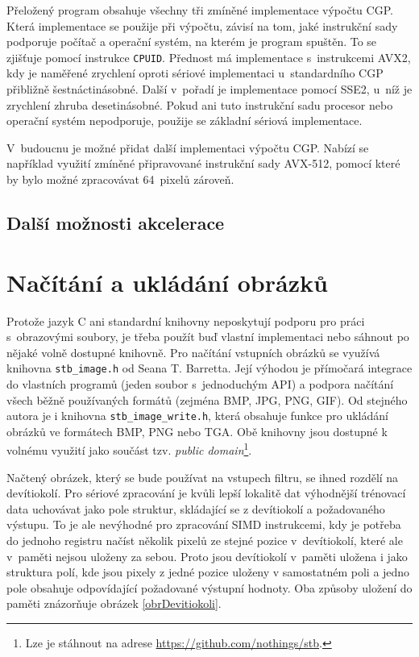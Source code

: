 Přeložený program obsahuje všechny tři zmíněné implementace výpočtu CGP. Která implementace se použije při výpočtu, závisí na tom, jaké instrukční sady podporuje počítač a operační systém, na kterém je program spuštěn. To se zjišťuje pomocí instrukce \texttt{CPUID}. Přednost má implementace s~instrukcemi AVX2, kdy je naměřené zrychlení oproti sériové implementaci u~standardního CGP přibližně šestnáctinásobné. Další v~pořadí je implementace pomocí SSE2, u~níž je zrychlení zhruba desetinásobné. Pokud ani tuto instrukční sadu procesor nebo operační systém nepodporuje, použije se základní sériová implementace.

V~budoucnu je možné přidat další implementaci výpočtu CGP. Nabízí se například využití zmíněné připravované instrukční sady AVX-512, pomocí které by bylo možné zpracovávat 64~pixelů zároveň.

\subsection{Další možnosti akcelerace}


\section{Načítání a ukládání obrázků}
\label{secImplImages}

Protože jazyk C ani standardní knihovny neposkytují podporu pro práci s~obrazovými soubory, je třeba použít buď vlastní implementaci nebo sáhnout po nějaké volně dostupné knihovně. Pro načítání vstupních obrázků se využívá knihovna \texttt{stb\_image.h} od Seana T. Barretta. Její výhodou je přímočará integrace do vlastních programů (jeden soubor s~jednoduchým API) a podpora načítání všech běžně používaných formátů (zejména BMP, JPG, PNG, GIF). Od stejného autora je i knihovna \texttt{stb\_image\_write.h}, která obsahuje funkce pro ukládání obrázků ve formátech BMP, PNG nebo TGA. Obě knihovny jsou dostupné k volnému využití jako součást tzv. \emph{public domain}\footnote{Lze je stáhnout na adrese \url{https://github.com/nothings/stb}.}.

Načtený obrázek, který se bude používat na vstupech filtru, se ihned rozdělí na devítiokolí. Pro sériové zpracování je kvůli lepší lokalitě dat výhodnější trénovací data uchovávat jako pole struktur, skládající se z devítiokolí a požadovaného výstupu. To je ale nevýhodné pro zpracování SIMD instrukcemi, kdy je potřeba do jednoho registru načíst několik pixelů ze stejné pozice v~devítiokolí, které ale v~paměti nejsou uloženy za sebou. Proto jsou devítiokolí v~paměti uložena i jako struktura polí, kde jsou pixely z jedné pozice uloženy v samostatném poli a jedno pole obsahuje odpovídající požadované výstupní hodnoty. Oba způsoby uložení do paměti znázorňuje obrázek \ref{obrDevitiokoli}.

